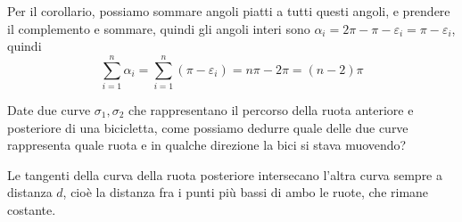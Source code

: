 \documentclass[a4paper]{article}
\begin{document}
\begin{snippetproof}{}
    Per il corollario, possiamo sommare angoli piatti a
    tutti questi angoli, e prendere il complemento e sommare,
    quindi gli angoli interi sono
    \(\alpha_i = 2\pi - \pi - \varepsilon_i = \pi - \varepsilon_i\),
    quindi
    \[
        \sum_{i=1}^n \alpha_i = \sum_{i=1}^n(\pi - \varepsilon_i) = n\pi - 2\pi = (n-2)\pi
    \]
\end{snippetproof}

\begin{snippetexercise}{}
    Date due curve \(\sigma_1,\sigma_2\)
    che rappresentano il percorso della ruota anteriore e posteriore di una bicicletta,
    come possiamo dedurre quale delle due curve rappresenta quale ruota e in qualche direzione
    la bici si stava muovendo?
\end{snippetexercise}

\begin{snippetsolution}{}
    Le tangenti della curva della ruota posteriore intersecano l'altra curva sempre a distanza
    \(d\), cioè la distanza fra i punti più bassi di ambo le ruote, che rimane costante.
\end{snippetsolution}
\end{document}
